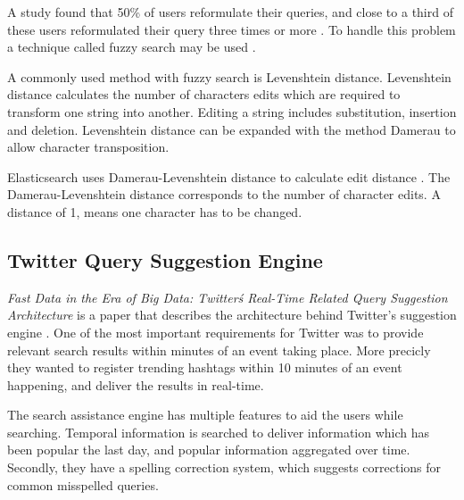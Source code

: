 A study found that 50\% of users reformulate their queries, and close to a third of these users reformulated their query three times or more \cite{query-reformulate}.
To handle this problem a technique called fuzzy search may be used \cite{fuzzy-search}.

A commonly used method with fuzzy search is Levenshtein distance.
Levenshtein distance calculates the number of characters edits which are required to transform one string into another.
Editing a string includes substitution, insertion and deletion.
Levenshtein distance can be expanded with the method Damerau to allow character transposition.

Elasticsearch uses Damerau-Levenshtein distance to calculate edit distance \cite{elasticsearch-fuzziness}.
The Damerau-Levenshtein distance corresponds to the number of character edits.
A distance of 1, means one character has to be changed.

\subsection{Twitter Query Suggestion Engine}
\textit{Fast Data in the Era of Big Data: Twitter\'s Real-Time Related Query Suggestion Architecture} is a paper that describes the architecture behind Twitter's suggestion engine \cite{twitter-suggestion}.
One of the most important requirements for Twitter was to provide relevant search results within minutes of an event taking place.
More precicly they wanted to register trending hashtags within 10 minutes of an event happening, and deliver the results in real-time.

The search assistance engine has multiple features to aid the users while searching.
Temporal information is searched to deliver information which has been popular the last day, and popular information aggregated over time.
Secondly, they have a spelling correction system, which suggests corrections for common misspelled queries.
